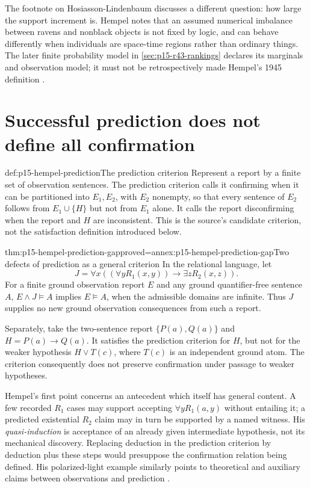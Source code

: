 The footnote on Hosiasson-Lindenbaum discusses a different question: how
large the support increment is. Hempel notes that an assumed numerical
imbalance between ravens and nonblack objects is not fixed by logic, and
can behave differently when individuals are space-time regions rather than
ordinary things. The later finite probability model in
\cref{sec:p15-r43-rankings} declares its marginals and observation model;
it must not be retrospectively made Hempel's 1945 definition
\parencite[I, pp.~21--22, n.~2]{Hempel1945ConfirmationI}.

\section{Successful prediction does not define all confirmation}
\label{sec:p15-hempel-prediction}

\begin{hbdefinition}{def:p15-hempel-prediction}{The prediction criterion}
Represent a report by a finite set of observation sentences. The prediction
criterion calls it confirming when it can be partitioned into $E_1,E_2$,
with $E_2$ nonempty, so that every sentence of $E_2$ follows from
$E_1\cup\{H\}$ but not from $E_1$ alone. It calls the report disconfirming
when the report and $H$ are inconsistent. This is the source's candidate
criterion, not the satisfaction definition introduced below.
\end{hbdefinition}

\begin{hbtheorem}{thm:p15-hempel-prediction-gap}{proved=annex:p15-hempel-prediction-gap}{Two defects of prediction as a general criterion}
In the relational language, let
\[
 J=\forall x((\forall y R_1(x,y))\to\exists zR_2(x,z)).
\]
For a finite ground observation report $E$ and any ground quantifier-free
sentence $A$, $E\land J\models A$ implies $E\models A$, when the admissible
domains are infinite. Thus $J$ supplies no new ground observation
consequences from such a report.

Separately, take the two-sentence report $\{P(a),Q(a)\}$ and
$H=P(a)\to Q(a)$. It satisfies the prediction criterion for $H$, but
not for the weaker hypothesis $H\lor T(c)$, where $T(c)$ is an independent
ground atom. The criterion consequently does not preserve confirmation
under passage to weaker hypotheses.
\end{hbtheorem}

Hempel's first point concerns an antecedent which itself has general
content. A few recorded $R_1$ cases may support accepting $\forall yR_1(a,y)$
without entailing it; a predicted existential $R_2$ claim may in turn be
supported by a named witness. His \emph{quasi-induction} is acceptance of
an already given intermediate hypothesis, not its mechanical discovery.
Replacing deduction in the prediction criterion by deduction plus these
steps would presuppose the confirmation relation being defined. His
polarized-light example similarly points to theoretical and auxiliary
claims between observations and prediction
\parencite[II, \S7, pp.~97--102]{Hempel1945ConfirmationII}.

